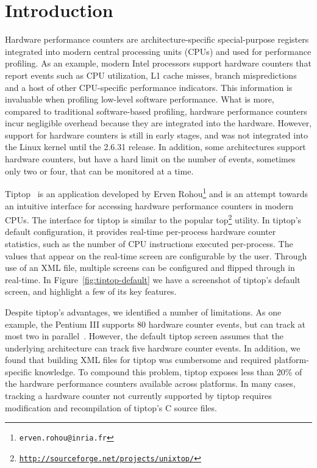 \section{Introduction}
Hardware performance counters are architecture-specific special-purpose registers integrated into modern central processing units (CPUs) and used for performance profiling.
As an example, modern Intel processors support hardware counters that report events such as CPU utilization, L1 cache misses, branch mispredictions and a host of other CPU-specific performance indicators.
This information is invaluable when profiling low-level software performance.
What is more, compared to traditional software-based profiling, hardware performance counters incur negligible overhead because they are integrated into the hardware.
However, support for hardware counters is still in early stages, and was not integrated into the Linux kernel until the 2.6.31 release.
In addition, some architectures support hardware counters, but have a hard limit on the number of events, sometimes only two or four, that can be monitored at a time.

Tiptop~\cite{rohou:hal-00639173} is an application developed by Erven Rohou\footnote{\texttt{erven.rohou@inria.fr}} and is an attempt towards an intuitive interface for accessing hardware performance counters in modern CPUs.
The interface for tiptop is similar to the popular top\footnote{\texttt{\url{http://sourceforge.net/projects/unixtop/}}} utility. 
In tiptop's default configuration, it provides real-time per-process hardware counter statistics, such as the number of CPU instructions executed per-process.
The values that appear on the real-time screen are configurable by the user.
Through use of an XML file, multiple screens can be configured and flipped through in real-time.
In Figure~\ref{fig:tiptop-default} we have a screenshot of tiptop's default screen, and highlight a few of its key features.

Despite tiptop's advantages, we identified a number of limitations.
As one example, the Pentium III supports 80 hardware counter events, but can track at most two in parallel~\cite{hpc-trusted}.
However, the default tiptop screen assumes that the underlying architecture can track five hardware counter events.
In addition, we found that building XML files for tiptop was cumbersome and required platform-specific knowledge.
To compound this problem, tiptop exposes less than 20\% of the hardware performance counters available across platforms.
In many cases, tracking a hardware counter not currently supported by tiptop requires modification and recompilation of tiptop's C source files.

